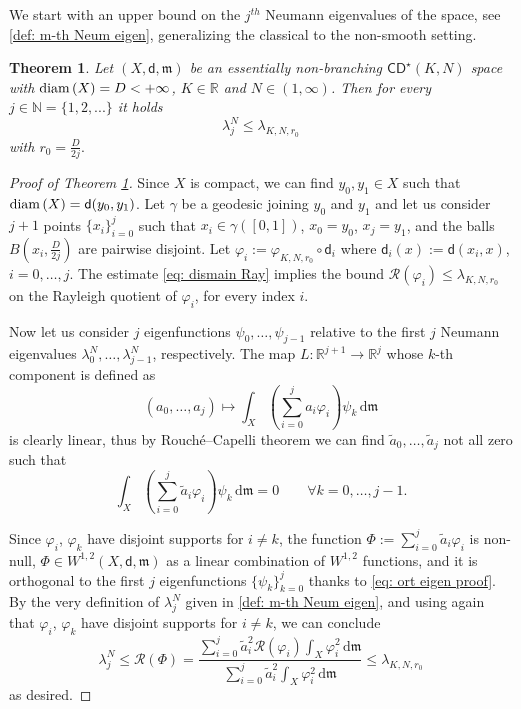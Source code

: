 \documentclass[12pt]{article}
\newcommand{\R}{\mathbb{R}}
\newcommand{\dd}{\mathrm{d}}
\newcommand{\N}{\mathbb{N}}
\newcommand{\diam}{{\rm{diam\,}}}
\newcommand{\CD}{\mathsf{CD}}
\newcommand{\mm}{\mathfrak m}
\newcommand{\di}{\mathsf{d}}
\theoremstyle{plain}
\newtheorem{theorem}[lemma]{Theorem}
\theoremstyle{definition}
\begin{document}
We start with an upper bound on the $j^{th}$ Neumann eigenvalues of the space, see \eqref{def: m-th Neum eigen}, generalizing the classical  \cite[Thm.]{cheng-bound}  to the non-smooth setting.
\begin{theorem}\label{th: Cheng neum}
Let $(X,\di,\mm)$ be an essentially non-branching $\CD^{\star}(K,N)$ space with $\diam(X)=D<+\infty$, $K\in \R$ and $N\in (1,\infty)$. Then for every $j\in \N=\{1,2,...\}$ it holds
$$\lambda_j^N\le \lambda_{K,N,r_0}$$
with $r_0=\frac{D}{2j}.$
\end{theorem}


\begin{proof}[Proof of Theorem \ref{th: Cheng neum}]
Since $X$ is compact, we can find $y_0,y_1\in X$ such that $\diam(X)=\di(y_0,y_1)$. Let $\gamma$ be a geodesic joining $y_0$ and $y_1$ and let us consider $j+1$ points $\{x_i\}_{i=0}^j$ such that $x_i\in \gamma([0,1])$, $x_0=y_0$, $x_j=y_1$, and the balls $B(x_i,\frac{D}{2j})$ are pairwise disjoint.
Let $\varphi_i:=\varphi_{K,N,r_0}\circ \di_i$ where $\di_i(x):=\di(x_i,x)$, $i=0,\dots,j$. The estimate \eqref{eq: dismain Ray} implies the bound $\mathcal{R}(\varphi_i)\le \lambda_{K,N,r_0}$ on the Rayleigh quotient of $\varphi_i$, for every index $i$.

Now let us consider $j$ eigenfunctions $\psi_0,\dots,\psi_{j-1}$ relative to the first $j$ Neumann eigenvalues $\lambda_0^N,\dots,\lambda_{j-1}^N$, respectively. The map $L:\R^{j+1}\to \R^j$ whose $k$-th component is defined as
$$(a_0,\dots,a_{j})\mapsto \int_X \left(\sum_{i=0}^{j}a_i\varphi_i\right)\psi_k\,\dd \mm$$
is clearly linear, thus by Rouché–Capelli theorem we can find $\tilde{a}_0,\dots,\tilde{a}_{j}$ not all zero such that
\begin{equation}\label{eq: ort eigen proof}
\int_X \left(\sum_{i=0}^{j}\tilde{a}_i\varphi_i\right)\psi_k\,\dd \mm=0 \qquad \forall k=0,\dots, j-1.
\end{equation}

Since $\varphi_i$, $\varphi_k$ have disjoint supports for $i\neq k$, the function $\Phi:=\displaystyle \sum_{i=0}^{j}\tilde{a}_i\varphi_i$ is non-null, $\Phi\in W^{1,2}(X,\di,\mm)$ as a linear combination of $W^{1,2}$ functions, and it is orthogonal to the first $j$ eigenfunctions $\{\psi_k\}_{k=0}^j$ thanks to \eqref{eq: ort eigen proof}. By the very definition of $\lambda_j^N$ given in \eqref{def: m-th Neum eigen}, and using again that $\varphi_i$, $\varphi_k$ have disjoint supports for $i\neq k$,  we can conclude
$$\lambda_j^N\le \mathcal{R}(\Phi)=\frac{\sum_{i=0}^{j}\tilde{a}_i^2\mathcal{R}(\varphi_i)\int_X \varphi_i^2\,\dd \mm}{\sum_{i=0}^{j}\tilde{a}_i^2\int_X \varphi_i^2\,\dd \mm}\le \lambda_{K,N,r_0}$$
as desired.
\end{proof}
\end{document}
